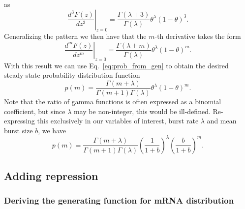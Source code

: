 as
\begin{equation}
\left.\frac{d^{3} F(z)}{d z^{3}}\right|_{z=0} = 
\frac{\Gamma(\lambda+3)}{\Gamma(\lambda)} \theta^{\lambda}(1-\theta)^{3}.
\end{equation}
Generalizing the pattern we then have that the $m$-th derivative takes the form
\begin{equation}
\left.\frac{d^{m} F(z)}{d z^{m}}\right|_{z=0} =
\frac{\Gamma(\lambda+m)}{\Gamma(\lambda)} \theta^{\lambda}(1-\theta)^{m}.
\end{equation}
With this result we can use Eq.~\ref{eq:prob_from_gen} to obtain the desired
steady-state probability distribution function
\begin{equation}
p(m) = \frac{\Gamma(m+\lambda)}{\Gamma(m+1)\Gamma(\lambda)}
        \theta^\lambda (1-\theta)^m.
\end{equation}
Note that the ratio of gamma functions is often expressed as a binomial
coefficient, but since $\lambda$ may be non-integer, this would be ill-defined.
Re-expressing this exclusively in our variables of interest, burst rate
$\lambda$ and mean burst size $b$, we have
\begin{equation}
p(m) = \frac{\Gamma(m+\lambda)}{\Gamma(m+1)\Gamma(\lambda)}
        \left(\frac{1}{1+b}\right)^\lambda
        \left(\frac{b}{1+b}\right)^m.
\label{eq:nbinom_deriv_final}
\end{equation}

\subsection{Adding repression}
\subsubsection{Deriving the generating function for mRNA distribution}

